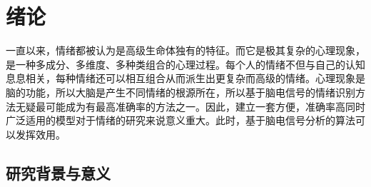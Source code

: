 
\chapter{绪论}
\label{chap:intro}
	一直以来，情绪都被认为是高级生命体独有的特征。而它是极其复杂的心理现象，是一种多成分、多维度、多种类组合的心理过程。每个人的情绪不但与自己的认知息息相关，每种情绪还可以相互组合从而派生出更复杂而高级的情绪。心理现象是脑的功能，所以大脑是产生不同情绪的根源所在，所以基于脑电信号的情绪识别方法无疑最可能成为有最高准确率的方法之一。因此，建立一套方便，准确率高同时广泛适用的模型对于情绪的研究来说意义重大。此时，基于脑电信号分析的算法可以发挥效用。


\section{研究背景与意义}

